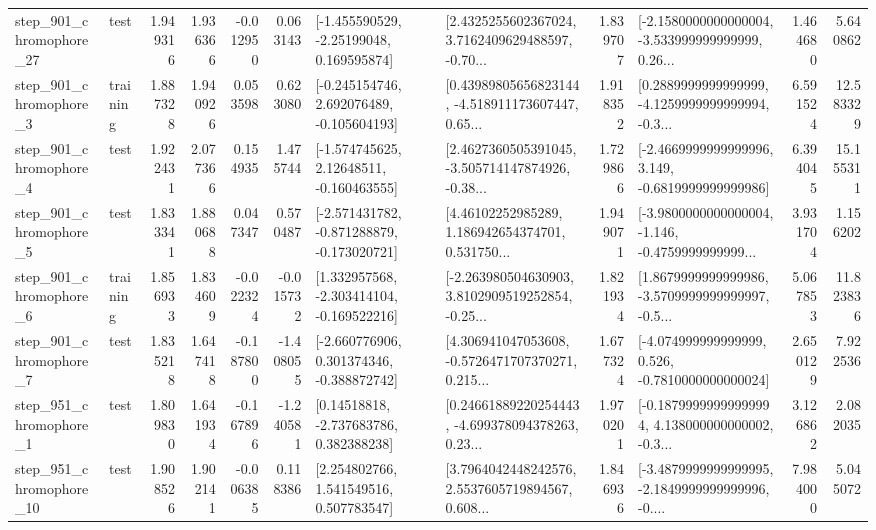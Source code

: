 \begin{tabular}{llrrrrllrlrr}
  step\_901\_chromophore\_27 &      test &      1.949316 &    1.936366 &     -0.012950 &  0.063143 &    [-1.455590529, -2.25199048, 0.169595874] &  [2.4325255602367024, 3.7162409629488597, -0.70... &       1.839707 &  [-2.1580000000000004, -3.533999999999999, 0.26... &            1.464680 &          5.640862 \\
   step\_901\_chromophore\_3 &  training &      1.887328 &    1.940926 &      0.053598 &  0.623080 &   [-0.245154746, 2.692076489, -0.105604193] &  [0.43989805656823144, -4.518911173607447, 0.65... &       1.918352 &  [0.2889999999999999, -4.1259999999999994, -0.3... &            6.591524 &         12.583329 \\
   step\_901\_chromophore\_4 &      test &      1.922431 &    2.077366 &      0.154935 &  1.475744 &    [-1.574745625, 2.12648511, -0.160463555] &  [2.4627360505391045, -3.505714147874926, -0.38... &       1.729866 &  [-2.4669999999999996, 3.149, -0.6819999999999986] &            6.394045 &         15.155311 \\
   step\_901\_chromophore\_5 &      test &      1.833341 &    1.880688 &      0.047347 &  0.570487 &  [-2.571431782, -0.871288879, -0.173020721] &  [4.46102252985289, 1.186942654374701, 0.531750... &       1.949071 &  [-3.9800000000000004, -1.146, -0.4759999999999... &            3.931704 &          1.156202 \\
   step\_901\_chromophore\_6 &  training &      1.856933 &    1.834609 &     -0.022324 & -0.015732 &   [1.332957568, -2.303414104, -0.169522216] &  [-2.263980504630903, 3.8102909519252854, -0.25... &       1.821934 &  [1.8679999999999986, -3.5709999999999997, -0.5... &            5.067853 &         11.823836 \\
   step\_901\_chromophore\_7 &      test &      1.835218 &    1.647418 &     -0.187800 & -1.408055 &   [-2.660776906, 0.301374346, -0.388872742] &  [4.306941047053608, -0.5726471707370271, 0.215... &       1.677324 &   [-4.074999999999999, 0.526, -0.7810000000000024] &            2.650129 &          7.922536 \\
   step\_951\_chromophore\_1 &      test &      1.809830 &    1.641934 &     -0.167896 & -1.240581 &     [0.14518818, -2.737683786, 0.382388238] &  [0.24661889220254443, -4.699378094378263, 0.23... &       1.970201 &  [-0.18799999999999994, 4.138000000000002, -0.3... &            3.126862 &          2.082035 \\
  step\_951\_chromophore\_10 &      test &      1.908526 &    1.902141 &     -0.006385 &  0.118386 &     [2.254802766, 1.541549516, 0.507783547] &  [3.7964042448242576, 2.5537605719894567, 0.608... &       1.846936 &  [-3.4879999999999995, -2.1849999999999996, -0.... &            7.984000 &          5.045072 \\

\end{tabular}

